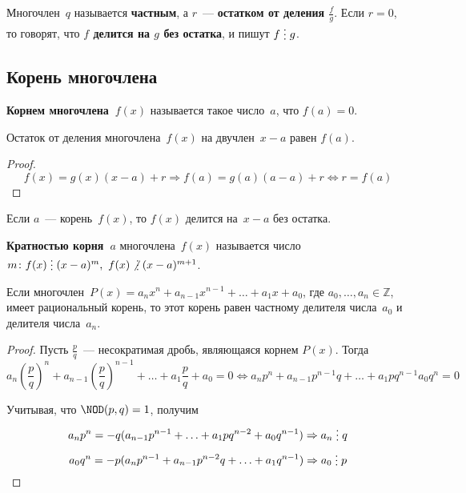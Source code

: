 Многочлен~$q$ называется \textbf{частным}, а $r$~--- \textbf{остатком от деления $\frac{f}g$}.
Если $r = 0$, то говорят, что \textbf{$f$ делится на $g$ без остатка}, и пишут $f \mult g$.

\subsection{Корень многочлена}
 \textbf{Корнем многочлена~$f(x)$} называется такое число~$a$, что $f(a) = 0$.

\begin{theorem}[Безу]
Остаток от деления многочлена~$f(x)$ на двучлен~$x - a$ равен $f(a)$.
\end{theorem}
\begin{proof}
\begin{equation*}
f(x) = g(x)(x - a) + r \Rightarrow f(a) = g(a)(a - a) + r \Leftrightarrow r = f(a)
\end{equation*}
\end{proof}

\begin{consequent}
\label{conseq:division_by_binomial}
Если $a$~--- корень~$f(x)$, то $f(x)$ делится на~$x - a$ без остатка.
\end{consequent}

\textbf{Кратностью корня~$a$} многочлена~$f(x)$ называется число~
$m \colon f(x) \mult (x - a)^m, \ f(x) \notmult (x - a)^{m+1}$.

\begin{theorem}
Если многочлен~$P(x) = a_n x^n + a_{n-1} x^{n-1} + \ldots + a_1 x + a_0$, где $a_0, \ldots, a_n \in \mathbb Z$, имеет рациональный корень, то этот корень равен частному делителя числа~$a_0$ и делителя числа~$a_n$.
\end{theorem}
\begin{proof}
Пусть $\frac{p}q$~--- несократимая дробь, являющаяся корнем $P(x)$.
Тогда
\begin{equation*}
a_n \left( \frac{p}q \right)^n + a_{n-1} \left( \frac{p}q \right)^{n-1} + \ldots + a_1 \frac{p}q + a_0 = 0 \Leftrightarrow
a_n p^n + a_{n-1} p^{n-1} q + \ldots + a_1 pq^{n-1} a_0 q^n = 0
\end{equation*}

Учитывая, что $\NOD(p, q) = 1$, получим
\begin{equation*}
a_n p^n = -q (a_{n-1} p^{n-1} + \ldots + a_1 pq^{n-2} + a_0 q^{n-1}) \Rightarrow
a_n \mult q
\end{equation*}
\begin{equation*}
a_0 q^n = -p (a_n p^{n-1} + a_{n-1} p^{n-2} q + \ldots + a_1 q^{n-1}) \Rightarrow
a_0 \mult p
\end{equation*}
\end{proof}